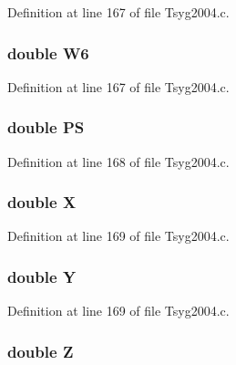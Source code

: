 Definition at line 167 of file Tsyg2004.c.\hypertarget{struct___t_s04_info_866e9e4ccaa55cf04d187988806f1250}{
\subsubsection[{W6}]{\setlength{\rightskip}{0pt plus 5cm}double {\bf W6}}}
\label{struct___t_s04_info_866e9e4ccaa55cf04d187988806f1250}




Definition at line 167 of file Tsyg2004.c.\hypertarget{struct___t_s04_info_a2d39f44b0d0c0b54e9d758deaacada6}{
\subsubsection[{PS}]{\setlength{\rightskip}{0pt plus 5cm}double {\bf PS}}}
\label{struct___t_s04_info_a2d39f44b0d0c0b54e9d758deaacada6}




Definition at line 168 of file Tsyg2004.c.\hypertarget{struct___t_s04_info_1059b82f84827fc49ea81b12566b3cdb}{
\subsubsection[{X}]{\setlength{\rightskip}{0pt plus 5cm}double {\bf X}}}
\label{struct___t_s04_info_1059b82f84827fc49ea81b12566b3cdb}




Definition at line 169 of file Tsyg2004.c.\hypertarget{struct___t_s04_info_c8d59bf77d5ef21e7c7a88b08f14c825}{
\subsubsection[{Y}]{\setlength{\rightskip}{0pt plus 5cm}double {\bf Y}}}
\label{struct___t_s04_info_c8d59bf77d5ef21e7c7a88b08f14c825}




Definition at line 169 of file Tsyg2004.c.\hypertarget{struct___t_s04_info_0f16a8f561453187897f0820186da39b}{
\subsubsection[{Z}]{\setlength{\rightskip}{0pt plus 5cm}double {\bf Z}}}
\label{struct___t_s04_info_0f16a8f561453187897f0820186da39b}




